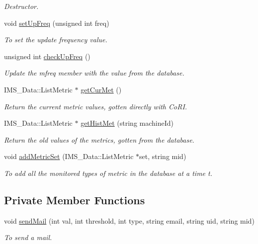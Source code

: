 \begin{DoxyCompactItemize}
\begin{DoxyCompactList}\small\item\em Destructor. \item\end{DoxyCompactList}\item 
void \hyperlink{classMetricServer_a3508b3a74dd1211e5b5941399f032496}{setUpFreq} (unsigned int freq)
\begin{DoxyCompactList}\small\item\em To set the update frequency value. \item\end{DoxyCompactList}\item 
unsigned int \hyperlink{classMetricServer_ae6f1cc4eda630823029dc6161f5bcd3e}{checkUpFreq} ()
\begin{DoxyCompactList}\small\item\em Update the mfreq member with the value from the database. \item\end{DoxyCompactList}\item 
IMS\_\-Data::ListMetric $\ast$ \hyperlink{classMetricServer_a0daa76199b933f12617c7088ef1295e8}{getCurMet} ()
\begin{DoxyCompactList}\small\item\em Return the current metric values, gotten directly with CoRI. \item\end{DoxyCompactList}\item 
IMS\_\-Data::ListMetric $\ast$ \hyperlink{classMetricServer_afcb928edb891800c34a5fda3cae4abe3}{getHistMet} (string machineId)
\begin{DoxyCompactList}\small\item\em Return the old values of the metrics, gotten from the database. \item\end{DoxyCompactList}\item 
void \hyperlink{classMetricServer_ad84b869bee5b7d1890c54fbf778b0ee1}{addMetricSet} (IMS\_\-Data::ListMetric $\ast$set, string mid)
\begin{DoxyCompactList}\small\item\em To add all the monitored types of metric in the database at a time t. \item\end{DoxyCompactList}\end{DoxyCompactItemize}
\subsection*{Private Member Functions}
\begin{DoxyCompactItemize}
\item 
void \hyperlink{classMetricServer_a4163ec4b6d279051877af2d3694151f6}{sendMail} (int val, int threshold, int type, string email, string uid, string mid)
\begin{DoxyCompactList}\small\item\em To send a mail. \item\end{DoxyCompactList}\end{DoxyCompactItemize}
